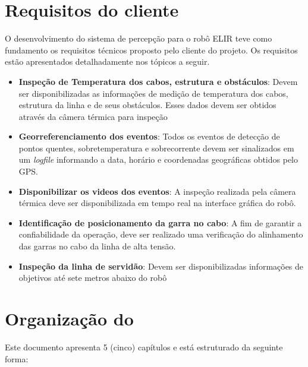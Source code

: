 
\section{Requisitos do cliente}
\label{sec:reqc}

O desenvolvimento do sistema de percepção para o robô ELIR teve como fundamento os requisitos técnicos proposto pelo cliente do projeto. Os requisitos estão apresentados detalhadamente nos tópicos a seguir.
    
    \begin{itemize}
    	\item{\textbf{Inspeção de Temperatura dos cabos, estrutura e obstáculos}}: Devem ser disponibilizadas as informações de medição de temperatura dos cabos, estrutura da linha e de seus obstáculos. Esses dados devem ser obtidos através da câmera térmica para inspeção
    	\item{\textbf{Georreferenciamento dos eventos}}: Todos os eventos de detecção de pontos quentes, sobretemperatura e sobrecorrente devem ser sinalizados em um \textit{logfile} informando a data, horário e coordenadas geográficas obtidos pelo GPS.
    	\item{\textbf{Disponibilizar os videos dos eventos}}: A inspeção realizada pela câmera térmica deve ser disponibilizada em tempo real na interface gráfica do robô.
    	\item{\textbf{Identificação de posicionamento da garra no cabo}}: A fim de garantir a confiabilidade da operação, deve ser realizado uma verificação do alinhamento das garras no cabo da linha de alta tensão.
    	\item{\textbf{Inspeção da linha de servidão}}: Devem ser disponibilizadas informações de objetivos até sete metros abaixo do robô
	\end{itemize}

\section{Organização do \thetypework}
\label{section:organizacao}

Este documento apresenta 5 (cinco) capítulos e está estruturado da seguinte forma:

